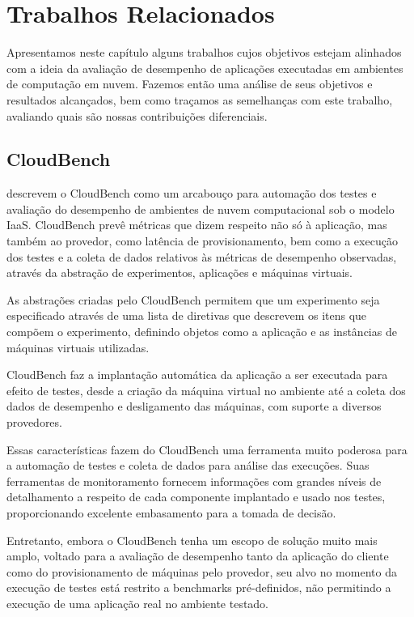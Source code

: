 \chapter[Trabalhos Relacionados]{Trabalhos Relacionados}
Apresentamos  neste capítulo alguns trabalhos cujos objetivos estejam alinhados 
com a ideia da avaliação de desempenho de aplicações executadas em ambientes de
computação em nuvem. Fazemos então uma análise de seus objetivos e resultados 
alcançados, bem como traçamos as semelhanças com este trabalho, avaliando quais são
nossas contribuições diferenciais.

\section{CloudBench}
\cite{silva2013cloudbench} descrevem o CloudBench como um arcabouço para 
automação dos testes e avaliação do desempenho de ambientes de nuvem computacional 
sob o modelo IaaS. CloudBench prevê métricas que dizem respeito não só à aplicação,
mas também ao provedor, como latência de provisionamento, bem como a execução dos 
testes e a coleta de dados relativos às métricas de desempenho observadas, através 
da abstração de experimentos, aplicações e máquinas virtuais.   

As abstrações criadas pelo CloudBench permitem que um experimento seja 
especificado através de uma lista de diretivas que descrevem os itens
que compõem o experimento, definindo objetos como a aplicação e as instâncias de 
máquinas virtuais utilizadas.

CloudBench faz a implantação automática da aplicação a ser executada para
efeito de testes, desde a criação da máquina virtual no ambiente até a coleta dos
dados de desempenho e desligamento das máquinas, com suporte a diversos provedores.

Essas características fazem do CloudBench uma ferramenta muito poderosa para a
automação de testes e coleta de dados para análise das execuções. Suas ferramentas
de monitoramento fornecem informações com grandes níveis de detalhamento a respeito
de cada componente implantado e usado nos testes, proporcionando excelente embasamento
para a tomada de decisão.

Entretanto, embora o CloudBench tenha um escopo de solução muito mais amplo, 
voltado para a avaliação de desempenho tanto da aplicação do cliente como do 
provisionamento de máquinas pelo provedor, seu alvo no momento da execução de 
testes está restrito a benchmarks pré-definidos, não permitindo a execução de 
uma aplicação real no ambiente testado.


